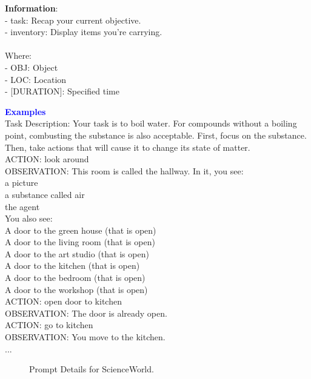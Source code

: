 \begin{tcolorbox}[breakable,title=Prompt Details for ScienceWorld]
\textbf{Information}:\\  - task: Recap your current objective.\\  - inventory: Display items you're carrying.\\ \\ Where: \\ - {OBJ}: Object\\ - {LOC}: Location\\ - [DURATION]: Specified time\\

\textbf{\textcolor{blue}{Examples}}\\
Task Description: Your task is to boil water. For compounds without a boiling point, combusting the substance is also acceptable. First, focus on the substance. Then, take actions that will cause it to change its state of matter.\\

ACTION: look around \\
OBSERVATION: This room is called the hallway. In it, you see: \\ 
	a picture \\
	a substance called air \\
	the agent \\
You also see: \\
	A door to the green house (that is open) \\
	A door to the living room (that is open) \\
	A door to the art studio (that is open) \\
	A door to the kitchen (that is open) \\
	A door to the bedroom (that is open) \\
	A door to the workshop (that is open) \\


ACTION: open door to kitchen \\
OBSERVATION: The door is already open. \\

ACTION: go to kitchen \\
OBSERVATION: You move to the kitchen. \\
...

\end{tcolorbox}
\begin{figure}[!h]
    \vspace{0.01cm}
    \caption{Prompt Details for ScienceWorld.}
    \label{fig:scienceworld_prompt}
\end{figure}